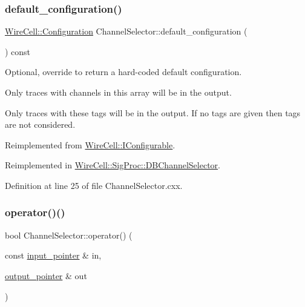 \subsubsection{\texorpdfstring{default\+\_\+configuration()}{default\_configuration()}}
{\footnotesize\ttfamily \hyperlink{namespace_wire_cell_a9f705541fc1d46c608b3d32c182333ee}{Wire\+Cell\+::\+Configuration} Channel\+Selector\+::default\+\_\+configuration (\begin{DoxyParamCaption}{ }\end{DoxyParamCaption}) const\hspace{0.3cm}{\ttfamily [virtual]}}



Optional, override to return a hard-\/coded default configuration. 

Only traces with channels in this array will be in the output.

Only traces with these tags will be in the output. If no tags are given then tags are not considered. 

Reimplemented from \hyperlink{class_wire_cell_1_1_i_configurable_a54841b2da3d1ea02189478bff96f7998}{Wire\+Cell\+::\+I\+Configurable}.



Reimplemented in \hyperlink{class_wire_cell_1_1_sig_proc_1_1_d_b_channel_selector_a541cbeeeadfc258ed5e60357c5c7b3d0}{Wire\+Cell\+::\+Sig\+Proc\+::\+D\+B\+Channel\+Selector}.



Definition at line 25 of file Channel\+Selector.\+cxx.

\mbox{\label{class_wire_cell_1_1_sig_proc_1_1_channel_selector_aaca59eb8b7d47e29fed24f6976adc4f3}} 
\subsubsection{\texorpdfstring{operator()()}{operator()()}}
{\footnotesize\ttfamily bool Channel\+Selector\+::operator() (\begin{DoxyParamCaption}\item[{const \hyperlink{class_wire_cell_1_1_i_function_node_a55c0946156df9b712b8ad1a0b59b2db6}{input\+\_\+pointer} \&}]{in,  }\item[{\hyperlink{class_wire_cell_1_1_i_function_node_afc02f1ec60d31aacddf64963f9ca650b}{output\+\_\+pointer} \&}]{out }\end{DoxyParamCaption})\hspace{0.3cm}{\ttfamily [virtual]}}



